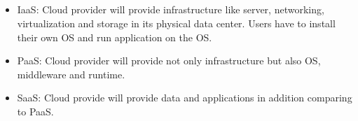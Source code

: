 \documentclass{article}
\begin{document}
        \subsection{}
            \begin{itemize}
                \item IaaS: Cloud provider will provide infrastructure like server, networking, virtualization and storage in its physical data center. Users have to install their own OS and run application on the OS. 
                \item PaaS: Cloud provider will provide not only infrastructure but also OS, middleware and runtime.
                \item SaaS: Cloud provide will provide data and applications in addition comparing to PaaS.
            \end{itemize}
\end{document}
